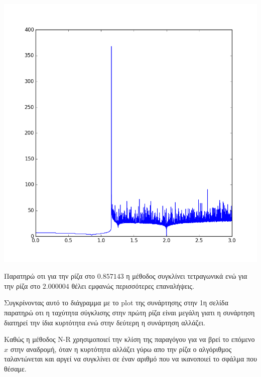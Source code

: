 \begin{center}
  \includegraphics[scale = 0.7]{ex1/starting_point-loops.png}
\end{center}

Παρατηρώ οτι για την ρίζα στο $0.857143$ η μέθοδος συγκλίνει τετραγωνικά
ενώ για την ρίζα στο $2.000004$ θέλει εμφανώς περισσότερες επαναλήψεις.

Συγκρίνοντας αυτό το διάγραμμα με το plot της συνάρτησης στην 1η σελίδα
παρατηρώ οτι η ταχύτητα σύγκλισης στην πρώτη ρίζα είναι μεγάλη γιατι η
συνάρτηση διατηρεί την ίδια κυρτότητα ενώ στην δεύτερη η συνάρτηση αλλάζει.

Καθώς η μέθοδος N-R χρησιμοποιεί την κλίση της παραγόγου για να βρεί το
επόμενο $x$ στην αναδρομή, όταν η κυρτότητα αλλάζει γύρω απο την ρίζα
ο αλγόριθμος ταλαντώνεται και αργεί να συγκλίνει σε έναν αριθμό που να ικανοποιεί
το σφάλμα που θέσαμε.

